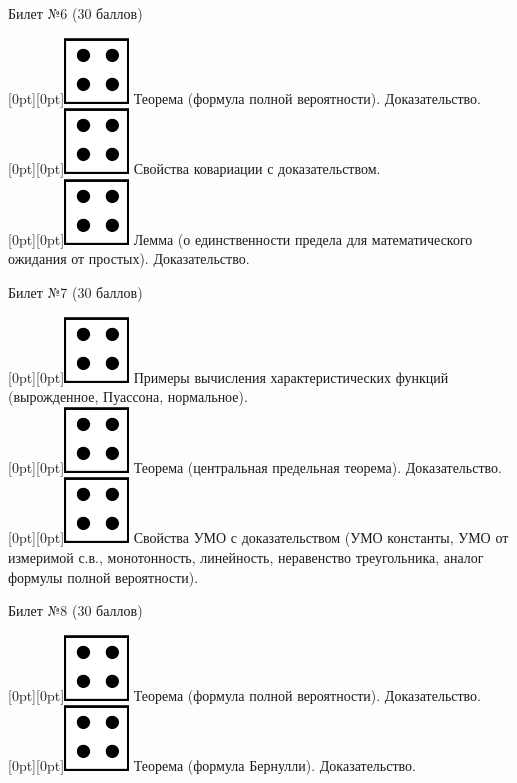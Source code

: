 \documentclass[preview]{standalone}
\begin{document}
\begin{center} {\Large Билет №6 (30 баллов)} \end{center}
\raisebox{-1pt}[0pt][0pt]{\includegraphics[width=0.02\linewidth]{4.png}} Теорема (формула полной вероятности). Доказательство. \\
\raisebox{-1pt}[0pt][0pt]{\includegraphics[width=0.02\linewidth]{4.png}} Свойства ковариации с доказательством. \\
\raisebox{-1pt}[0pt][0pt]{\includegraphics[width=0.02\linewidth]{4.png}} Лемма (о единственности предела для математического ожидания от простых). Доказательство. \\ 
\begin{center} {\Large Билет №7 (30 баллов)} \end{center}
\raisebox{-1pt}[0pt][0pt]{\includegraphics[width=0.02\linewidth]{4.png}} Примеры вычисления характеристических функций (вырожденное, Пуассона, нормальное). \\
\raisebox{-1pt}[0pt][0pt]{\includegraphics[width=0.02\linewidth]{4.png}} Теорема (центральная предельная теорема). Доказательство. \\        
\raisebox{-1pt}[0pt][0pt]{\includegraphics[width=0.02\linewidth]{4.png}} Свойства УМО с доказательством (УМО константы, УМО от измеримой с.в., монотонность,  линейность, неравенство треугольника,  аналог формулы полной вероятности). \\
\begin{center} {\Large Билет №8 (30 баллов)} \end{center}
\raisebox{-1pt}[0pt][0pt]{\includegraphics[width=0.02\linewidth]{4.png}} Теорема (формула полной вероятности). Доказательство. \\
\raisebox{-1pt}[0pt][0pt]{\includegraphics[width=0.02\linewidth]{4.png}} Теорема (формула Бернулли). Доказательство. \\
\end{document}
